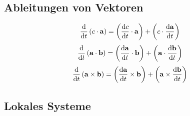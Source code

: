 \subsection{Ableitungen von Vektoren}
\begin{equation}
\frac{\mathrm d }{\mathrm d t}\left(c \cdot \mathbf{a}\right) =  \left( \frac{\mathrm d c}{\mathrm d t} \cdot \mathbf{a} \right) + \left( c \cdot \frac{\mathrm d \mathbf{a}}{\mathrm d t} \right) 
\end{equation}
\begin{equation}
\frac{\mathrm d }{\mathrm d t}\left(\mathbf{a} \cdot \mathbf{b}\right) =  \left( \frac{\mathrm d \mathbf{a}}{\mathrm d t} \cdot \mathbf{b} \right) + \left( \mathbf{a} \cdot \frac{\mathrm d \mathbf{b}}{\mathrm d t} \right) 
\end{equation}
\begin{equation}
\frac{\mathrm d }{\mathrm d t}\left(\mathbf{a} \times \mathbf{b}\right) =  \left( \frac{\mathrm d \mathbf{a}}{\mathrm d t} \times \mathbf{b} \right) + \left( \mathbf{a} \times \frac{\mathrm d \mathbf{b}}{\mathrm d t} \right) 
\end{equation}

\subsection{Lokales Systeme}
